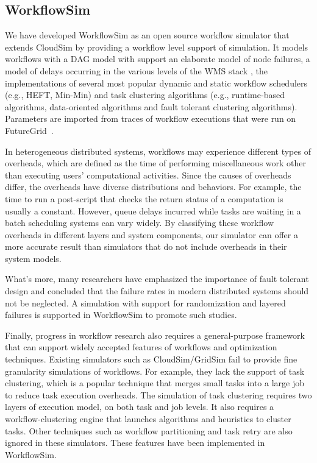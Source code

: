 \subsection{WorkflowSim}

We have developed WorkflowSim as an open source workflow simulator that extends CloudSim \cite{Calheiros2011} by providing a workflow level support of simulation. It models workflows with a DAG model with support an elaborate model of node failures, a model of delays occurring in the various levels of the WMS stack \cite{Chen2011}, the implementations of several most popular dynamic and static workflow schedulers (e.g., HEFT, Min-Min) and task clustering algorithms (e.g., runtime-based algorithms, data-oriented algorithms and fault tolerant clustering algorithms). Parameters are imported from traces of workflow executions that were run on FutureGrid~\cite{Fox2013FutureGrid}. 

In heterogeneous distributed systems, workflows may experience different types of overheads, which are defined as the time of performing miscellaneous work other than executing users’ computational activities.  Since the causes of overheads differ, the overheads have diverse distributions and behaviors. For example, the time to run a post-script that checks the return status of a computation is usually a constant. However, queue delays incurred while tasks are waiting in a batch scheduling systems can vary widely. 
By classifying these workflow overheads in different layers and system components, our simulator can offer a more accurate result than simulators that do not include overheads in their system models.

What’s more, many researchers \cite{Zhang2004, Tang1990, Schroeder2006, Sahoo2004, Oppenheimer2002, McConnel1979} have emphasized the importance of fault tolerant design and concluded that the failure rates in modern distributed systems should not be neglected. A simulation with support for randomization and layered failures is supported in WorkflowSim to promote such studies. 

Finally, progress in workflow research also requires a general-purpose framework that can support widely accepted features of workflows and optimization techniques. Existing simulators such as CloudSim/GridSim \cite{Calheiros2011} fail to provide fine granularity simulations of workflows. For example, they lack the support of task clustering, which is a popular technique that merges small tasks into a large job to reduce task execution overheads. The simulation of task clustering requires two layers of execution model, on both task and job levels. It also requires a workflow-clustering engine that launches algorithms and heuristics to cluster tasks. Other techniques such as workflow partitioning and task retry are also ignored in these simulators. These features have been implemented in WorkflowSim. 

